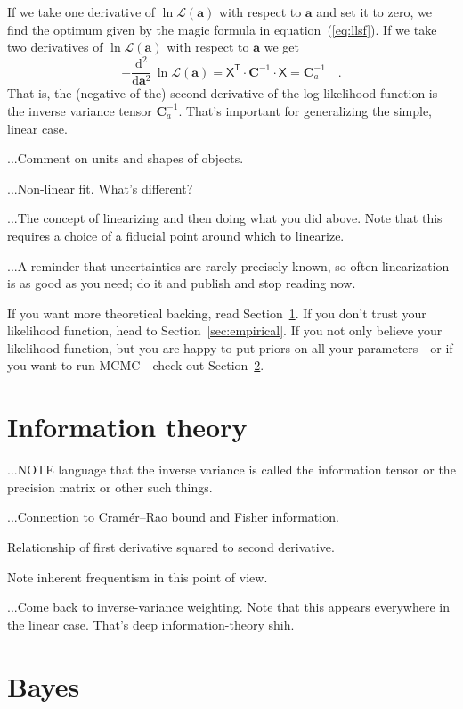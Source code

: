\documentclass[10pt]{article}
\newcommand{\sectionname}{Section}
\newcommand{\equationname}{equation}
\newcommand{\dd}{\mathrm{d}}
\newcommand{\T}{^{\!\mathsf{T}\!}}
\newcommand{\inv}{^{-1}}
\renewcommand{\vector}[1]{\boldsymbol{#1}}
\newcommand{\tensor}[1]{\mathbf{#1}}
\renewcommand{\matrix}[1]{\mathsf{#1}}
\newcommand{\like}{\mathscr{L}}
\newcommand{\va}{\vector{a}}
\newcommand{\tC}{\tensor{C}}
\newcommand{\mX}{\matrix{X}}
\begin{document}
If we take one derivative of $\ln\like(\va)$ with respect to $\va$ and set it
to zero, we find the optimum given by the magic formula in
\equationname~(\ref{eq:llsf}).
If we take two derivatives of $\ln\like(\va)$ with respect to $\va$ we get
\begin{equation}
  -\frac{\dd^2}{\dd\va^2}\,\ln\like(\va) = \mX\T\cdot\tC\inv\cdot\mX = \tC_a\inv
  \quad.
\end{equation}
That is, the (negative of the) second derivative of the log-likelihood function is
the inverse variance tensor $\tC_a\inv$.
That's important for generalizing the simple, linear case.

...Comment on units and shapes of objects.

...Non-linear fit. What's different?

...The concept of linearizing and then doing what you did above. Note that this
requires a choice of a fiducial point around which to linearize.

...A reminder that uncertainties are rarely precisely known, so often linearization
is as good as you need; do it and publish and stop reading now.

If you want more theoretical backing, read \sectionname~\ref{sec:info}. If you
don't trust your likelihood function, head to \sectionname~\ref{sec:empirical}.
If you not only believe your likelihood function, but you are happy to put priors
on all your parameters---or if you want to run MCMC---check
out \sectionname~\ref{sec:bayes}.

\section{Information theory}\label{sec:info}

...NOTE language that the inverse variance is called the information tensor or the precision matrix or other such things.

...Connection to Cram\'er--Rao bound and Fisher information.

Relationship of first derivative squared to second derivative.

Note inherent frequentism in this point of view.

...Come back to inverse-variance weighting. Note that this appears everywhere
in the linear case. That's deep information-theory shih.

\section{Bayes}\label{sec:bayes}
\end{document}
